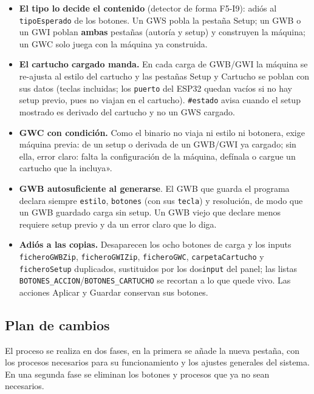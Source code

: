 \begin{itemize}
\begin{enumerate}
		\item zona de arrastre que acepta ficheros o carpetas y el pegado con Ctrl+V donde el navegador dé \texttt{clipboardData} (con archivos; lo demás, aviso).
	\end{enumerate}	 
	\item \textbf{El tipo lo decide el contenido} (detector de forma F5-I9):
	adiós al \texttt{tipoEsperado} de los botones. Un GWS pobla la pestaña
	Setup; un GWB o un GWI poblan \textbf{ambas} pestañas (autoría y setup)
	y construyen la máquina; un GWC solo juega con la máquina ya construida.
	\item \textbf{El cartucho cargado manda.} En cada carga de GWB/GWI la
	máquina se re-ajusta al estilo del cartucho y las pestañas Setup y
	Cartucho se poblan con sus datos (teclas incluidas; los \texttt{puerto}
	del ESP32 quedan vacíos si no hay setup previo, pues no viajan en el
	cartucho). \texttt{\#estado} avisa cuando el setup mostrado es derivado
	del cartucho y no un GWS cargado.
	\item \textbf{GWC con condición.} Como el binario no viaja ni estilo ni
	botonera, exige máquina previa: de un setup o derivada de un GWB/GWI ya
	cargado; sin ella, error claro: falta la configuración de la
	máquina, defínala o cargue un cartucho que la incluya».
	\item \textbf{GWB autosuficiente al generarse}. El GWB que guarda el
	programa declara siempre \texttt{estilo}, \texttt{botones} (con sus
	\texttt{tecla}) y resolución, de modo que un GWB guardado carga sin
	setup. Un GWB viejo que declare menos requiere setup previo y da un error
	claro que lo diga.
	\item \textbf{Adiós a las copias.} Desaparecen los ocho botones de carga
	y los inputs \texttt{ficheroGWBZip}, \texttt{ficheroGWIZip},
	\texttt{ficheroGWC}, \texttt{carpetaCartucho} y \texttt{ficheroSetup}
	duplicados, sustituidos por los dos\texttt{input} del panel; las
	listas \texttt{BOTONES\_ACCION}/\texttt{BOTONES\_CARTUCHO} se recortan a
	lo que quede vivo. Las acciones Aplicar y Guardar conservan sus botones.
\end{itemize}

\subsection{Plan de cambios}
\label{sec:F5I19Plan}

El proceso se realiza en dos fases, en la primera se añade la nueva pestaña, con los procesos necesarios para su funcionamiento y los ajustes generales del sistema. En una segunda fase se eliminan los botones y procesos que ya no sean necesarios.


